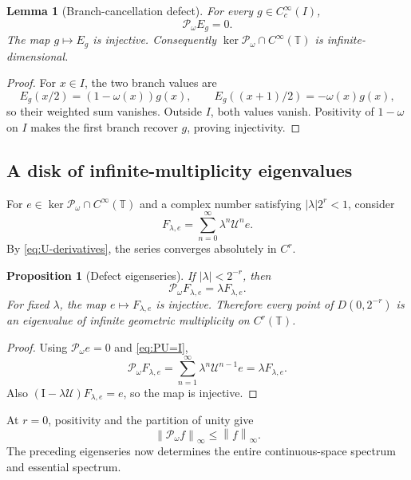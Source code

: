 \documentclass[11pt,a4paper]{article}
\newtheorem{lemma}[theorem]{Lemma}
\newtheorem{proposition}[theorem]{Proposition}
\theoremstyle{definition}
\theoremstyle{remark}
\newcommand{\T}{\mathbb T}
\newcommand{\norm}[1]{\left\lVert #1\right\rVert}
\newcommand{\Pop}{\mathcal P}
\newcommand{\Uop}{\mathcal U}
\newcommand{\id}{\mathrm I}
\begin{document}
\begin{lemma}[Branch-cancellation defect]
\label{lem:defect}
For every $g\in C_c^\infty(I)$,
\begin{equation}
 \Pop_\omega E_g=0.
 \label{eq:defect-kernel}
\end{equation}
The map $g\mapsto E_g$ is injective.  Consequently
$\ker\Pop_\omega\cap C^\infty(\T)$ is infinite-dimensional.
\end{lemma}
\begin{proof}
For $x\in I$, the two branch values are
\[
 E_g(x/2)=(1-\omega(x))g(x),\qquad
 E_g((x+1)/2)=-\omega(x)g(x),
\]
so their weighted sum vanishes.  Outside $I$, both values vanish.  Positivity
of $1-\omega$ on $I$ makes the first branch recover $g$, proving injectivity.
\end{proof}

\subsection{A disk of infinite-multiplicity eigenvalues}
For $e\in\ker\Pop_\omega\cap C^\infty(\T)$ and a complex number satisfying
$|\lambda|2^r<1$, consider
\begin{equation}
 F_{\lambda,e}=\sum_{n=0}^\infty \lambda^n\Uop^n e.
 \label{eq:eigenseries}
\end{equation}
By \eqref{eq:U-derivatives}, the series converges absolutely in $C^r$.

\begin{proposition}[Defect eigenseries]
\label{prop:defect-eigenseries}
If $|\lambda|<2^{-r}$, then
\begin{equation}
 \Pop_\omega F_{\lambda,e}=\lambda F_{\lambda,e}.
 \label{eq:eigenseries-equation}
\end{equation}
For fixed $\lambda$, the map $e\mapsto F_{\lambda,e}$ is injective.
Therefore every point of $D(0,2^{-r})$ is an eigenvalue of infinite geometric
multiplicity on $C^r(\T)$.
\end{proposition}
\begin{proof}
Using $\Pop_\omega e=0$ and \eqref{eq:PU=I},
\[
 \Pop_\omega F_{\lambda,e}
 =\sum_{n=1}^\infty\lambda^n\Uop^{n-1}e
 =\lambda F_{\lambda,e}.
\]
Also $(\id-\lambda\Uop)F_{\lambda,e}=e$, so the map is injective.
\end{proof}

At $r=0$, positivity and the partition of unity give
\begin{equation}
 \norm{\Pop_\omega f}_\infty\le\norm f_\infty.
 \label{eq:C0-contraction}
\end{equation}
The preceding eigenseries now determines the entire continuous-space
spectrum and essential spectrum.
\end{document}
